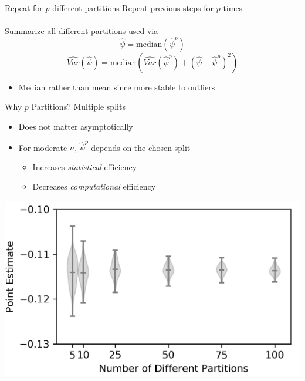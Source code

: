 \documentclass{beamer}
\begin{document}
\begin{frame}{Repeat for $p$ different partitions}
	Repeat previous steps for $p$ times\\~\\
	Summarize all different partitions used via
	\[\hat{\psi} = \text{median}(\hat{\psi}^p)\]
	\[\widehat{Var}(\hat{\psi}) = \text{median}\left(\widehat{Var}(\hat{\psi}^p) + (\hat{\psi} - \hat{\psi}^p)^2\right)\]
	\begin{itemize}
		\item Median rather than mean since more stable to outliers
	\end{itemize}
\end{frame}

\begin{frame}{Why $p$ Partitions?}
	Multiple splits
	\begin{itemize}
		\item Does not matter asymptotically
		\item For moderate $n$, $\hat{\psi}^p$ depends on the chosen split
		\begin{itemize}
			\item Increases \textit{statistical} efficiency
			\item Decreases \textit{computational} efficiency
		\end{itemize}
	\end{itemize}
	\begin{center}
		\includegraphics[scale=0.55]{images/multiple_p2.png}
	\end{center}
\end{frame}
\end{document}
